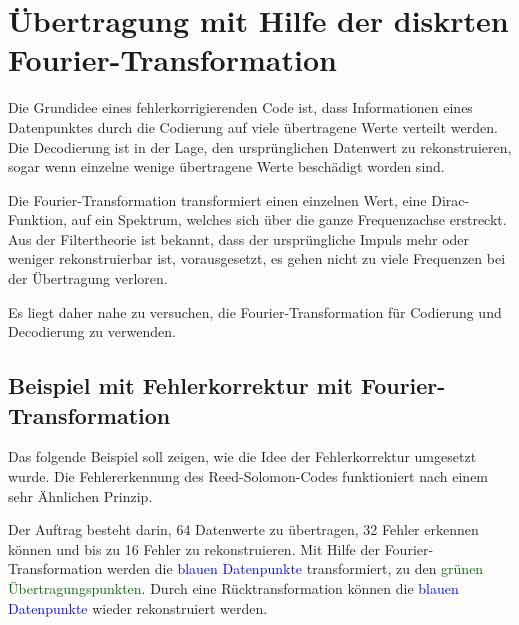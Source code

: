 %
%
\section{Übertragung mit Hilfe der diskrten Fourier-Transformation
\label{reedsolomon:section:dtf}}
Die Grundidee eines fehlerkorrigierenden Code ist, dass Informationen eines Datenpunktes
durch die Codierung auf viele übertragene Werte verteilt werden.
Die Decodierung ist in der Lage, den ursprünglichen Datenwert zu rekonstruieren,
sogar wenn einzelne wenige übertragene Werte beschädigt worden sind.
\par
Die Fourier-Transformation transformiert einen einzelnen Wert, 
eine Dirac-Funktion, auf ein Spektrum, welches sich über die ganze Frequenzachse erstreckt.
Aus der Filtertheorie ist bekannt, dass der ursprüngliche Impuls mehr oder weniger rekonstruierbar ist,
	vorausgesetzt, es gehen nicht zu viele Frequenzen bei der Übertragung verloren.
\par
Es liegt daher nahe zu versuchen, die Fourier-Transformation 
für Codierung und Decodierung zu verwenden.

\subsection{Beispiel mit Fehlerkorrektur mit Fourier-Transformation
\label{reedsolomon:subsection:sendbsp}}
Das folgende Beispiel soll zeigen, wie die Idee der Fehlerkorrektur umgesetzt wurde. 
Die Fehlererkennung des Reed-Solomon-Codes funktioniert nach einem sehr Ähnlichen Prinzip.

\par
Der Auftrag besteht darin, 64 Datenwerte zu übertragen, 32 Fehler erkennen können und bis zu 16 Fehler zu rekonstruieren.
Mit Hilfe der Fourier-Transformation werden die \textcolor{blue}{blauen Datenpunkte} transformiert,
zu den \textcolor{darkgreen}{grünen Übertragungspunkten}. 
Durch eine Rücktransformation können die \textcolor{blue}{blauen Datenpunkte} wieder rekonstruiert werden.

